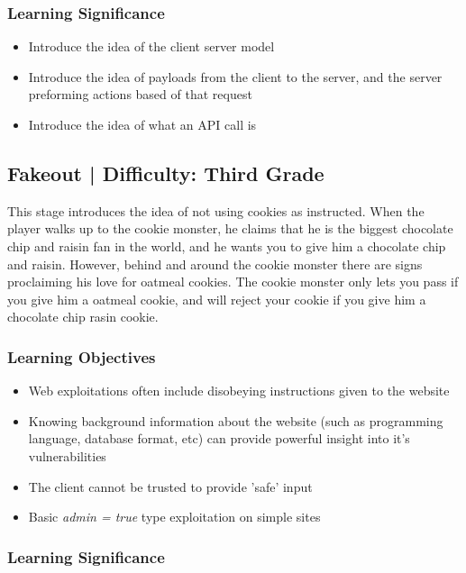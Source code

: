 \documentclass{article}
\begin{document}
\subsubsection{Learning Significance}

\begin{itemize}
  \item Introduce the idea of the client server model
  \item Introduce the idea of payloads from the client to the server,
    and the server preforming actions based of that request
  \item Introduce the idea of what an API call is
\end{itemize}

\subsection{Fakeout | Difficulty: Third Grade}
This stage introduces the idea of not using cookies as
instructed. When the player walks up to the cookie monster, he claims
that he is the biggest chocolate chip and raisin fan in the world, and
he wants you to give him a chocolate chip and raisin. However, behind
and around the cookie monster there are signs proclaiming his love for
oatmeal cookies. The cookie monster only lets you pass if you give him
a oatmeal cookie, and will reject your cookie if you give him a
chocolate chip rasin cookie.

\subsubsection{Learning Objectives}

\begin{itemize}
  \item Web exploitations often include disobeying instructions given
to the website
  \item Knowing background information about the website (such as
programming language, database format, etc) can provide powerful
insight into it's vulnerabilities
  \item The client cannot be trusted to provide 'safe' input
  \item Basic \textit{admin = true} type exploitation on simple sites
\end{itemize}

\subsubsection{Learning Significance}
\end{document}
